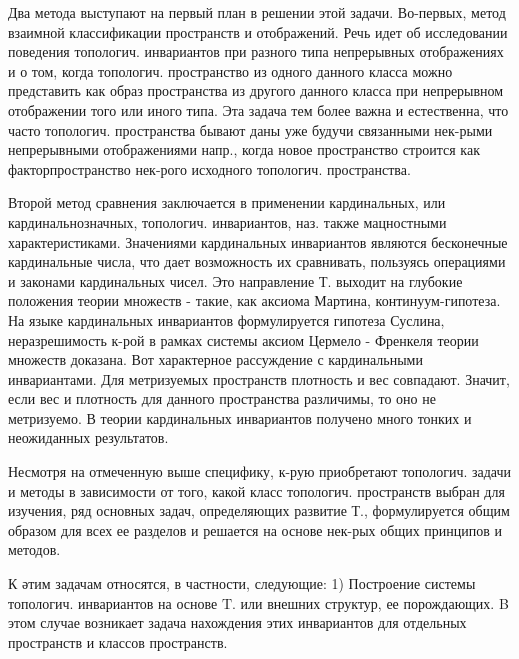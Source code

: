 \documentclass[10pt]{article}
\begin{document}
Два метода выступают на первый план в решении этой задачи. Во-первых, метод взаимной классификации пространств и отображений. Речь идет об исследовании поведения топологич. инвариантов при разного типа непрерывных отображениях и о том, когда топологич. пространство из одного данного класса можно представить как образ пространства из другого данного класса при непрерывном отображении того или иного типа. Эта задача тем более важна и естественна, что часто топологич. пространства бывают даны уже будучи связанными нек-рыми непрерывными отображениями напр., когда новое пространство строится как факторпространство нек-рого исходного топологич. пространства.



Второй метод сравнения заключается в применении кардинальных, или кардинальнозначных, топологич. инвариантов, наз. также мацностными характеристиками. Значениями кардинальных инвариантов являются бесконечные кардинальные числа, что дает возможность их сравнивать, пользуясь операциями и законами кардинальных чисел. Это направление Т. выходит на глубокие положения теории множеств - такие, как аксиома Мартина, континуум-гипотеза. На языке кардинальных инвариантов формулируется гипотеза Суслина, неразрешимость к-рой в рамках системы аксиом Цермело - Френкеля теории множеств доказана. Вот характерное рассуждение с кардинальными инвариантами. Для метризуемых пространств плотность и вес совпадают. Значит, если вес и плотность для данного пространства различимы, то оно не метризуемо. В теории кардинальных инвариантов получено много тонких и неожиданных результатов.



Несмотря на отмеченную выше специфику, к-рую приобретают топологич. задачи и методы в зависимости от того, какой класс топологич. пространств выбран для изучения, ряд основных задач, определяющих развитие Т., формулируется общим образом для всех ее разделов и решается на основе нек-рых общих принципов и методов.



К әтим задачам относятся, в частности, следующие: 1) Построение системы топологич. инвариантов на основе $\mathrm{T}$. или внешних структур, ее порождающих. B этом случае возникает задача нахождения этих инвариантов для отдельных пространств и классов пространств.
\end{document}
